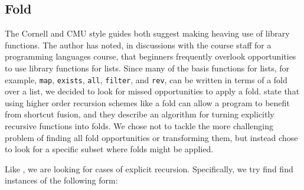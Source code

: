 \documentclass[12pt,abstracton]{scrartcl}
\begin{document}
\subsection{Fold}\label{subsec:fold}
The Cornell and CMU style guides both suggest making heaving use of library functions.
The author has noted, in discussions with the course staff for a programming languages course,
that beginners frequently overlook opportunities to
use library functions for lists. Since many of the basis functions
for lists, for example, \texttt{map}, \texttt{exists}, \texttt{all}, \texttt{filter},
and \texttt{rev}, can be written in terms of a fold over a list, we decided to look
for missed opportunities to apply a fold.
\cite{Jeu13} state that using higher order recursion schemes like a fold can allow a program
to benefit from shortcut fusion, and they
describe an algorithm for turning
explicitly recursive functions into folds.
We chose not to tackle the more challenging
problem of finding all fold opportunities or transforming them,
but instead chose to look for a specific
subset where folds might be applied.

Like \cite{Jeu13}, we are looking for cases of explicit recursion. Specifically, we try find
find instances of the following form:
\end{document}
